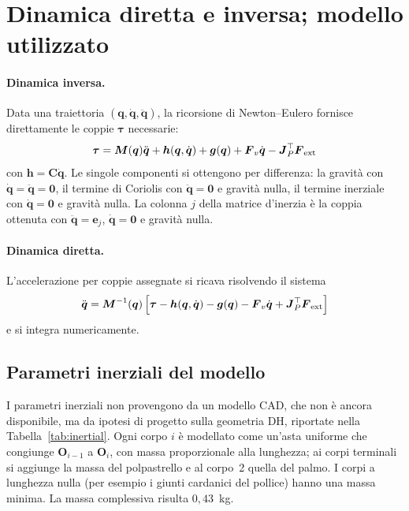 \section{Dinamica diretta e inversa; modello utilizzato}
\label{sec:dir_inv}

\paragraph{Dinamica inversa.} Data una traiettoria $(\boldsymbol q,\dot{\boldsymbol q},\ddot{\boldsymbol q})$, la ricorsione di Newton--Eulero fornisce direttamente le coppie $\boldsymbol\tau$ necessarie:
\begin{equation}
    \boldsymbol\tau=\boldsymbol M(\boldsymbol q)\ddot{\boldsymbol q}+\boldsymbol h(\boldsymbol q,\dot{\boldsymbol q})+\boldsymbol g(\boldsymbol q)+\boldsymbol F_v\dot{\boldsymbol q}-\boldsymbol J_P^\top\boldsymbol F_{\rm ext}
\end{equation}
con $\boldsymbol h=\boldsymbol C\dot{\boldsymbol q}$. Le singole componenti si ottengono per differenza: la gravità con $\dot{\boldsymbol q}=\ddot{\boldsymbol q}=\boldsymbol 0$, il termine di Coriolis con $\ddot{\boldsymbol q}=\boldsymbol 0$ e gravità nulla, il termine inerziale con $\dot{\boldsymbol q}=\boldsymbol 0$ e gravità nulla. La colonna $j$ della matrice d'inerzia è la coppia ottenuta con $\ddot{\boldsymbol q}=\boldsymbol e_j$, $\dot{\boldsymbol q}=\boldsymbol 0$ e gravità nulla.

\paragraph{Dinamica diretta.} L'accelerazione per coppie assegnate si ricava risolvendo il sistema
\begin{equation}
    \ddot{\boldsymbol q}=\boldsymbol M^{-1}(\boldsymbol q)\left[\boldsymbol\tau-\boldsymbol h(\boldsymbol q,\dot{\boldsymbol q})-\boldsymbol g(\boldsymbol q)-\boldsymbol F_v\dot{\boldsymbol q}+\boldsymbol J_P^\top\boldsymbol F_{\rm ext}\right]
\end{equation}
e si integra numericamente.

\subsection{Parametri inerziali del modello}

I parametri inerziali non provengono da un modello CAD, che non è ancora disponibile, ma da ipotesi di progetto sulla geometria DH, riportate nella Tabella~\ref{tab:inertial}. Ogni corpo $i$ è modellato come un'asta uniforme che congiunge $\boldsymbol O_{i-1}$ a $\boldsymbol O_i$, con massa proporzionale alla lunghezza; ai corpi terminali si aggiunge la massa del polpastrello e al corpo~2 quella del palmo. I corpi a lunghezza nulla (per esempio i giunti cardanici del pollice) hanno una massa minima. La massa complessiva risulta $0{,}43$~kg.

